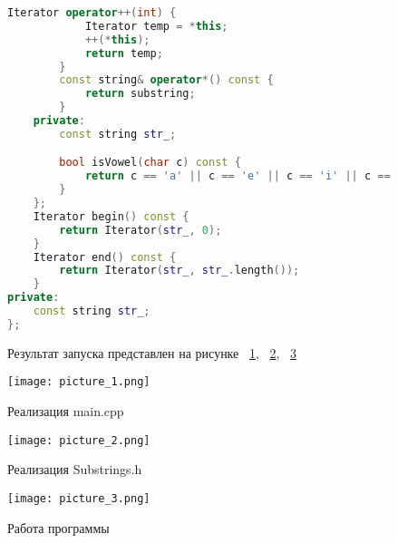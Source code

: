 \documentclass[a4paper, 14pt]{extarticle}
\begin{document}
\begin{figure}[!htb]
\begin{lstlisting}[language={c++},caption={Substrings.h(продолжение)},label={lst:code3}]
        Iterator operator++(int) {
            Iterator temp = *this;
            ++(*this);
            return temp;
        }
        const string& operator*() const {
            return substring;
        }
    private:
        const string str_;

        bool isVowel(char c) const {
            return c == 'a' || c == 'e' || c == 'i' || c == 'o' || c == 'u' || c == 'A' || c == 'E' || c == 'I' || c == 'O' || c == 'U';
        }
    };
    Iterator begin() const {
        return Iterator(str_, 0);
    }
    Iterator end() const {
        return Iterator(str_, str_.length());
    }
private:
    const string str_;
};
\end{lstlisting}
\end{figure}

\begin{figure}[!htb]
Результат запуска представлен на рисунке ~\ref{fig:picture_1.png}, ~\ref{fig:picture_2.png}, ~\ref{fig:picture_3.png}
\end{figure}

\begin{figure}[!htb]
	\centering
	\texttt{[image: picture\_1.png]}
\caption{Реализация main.cpp}
\label{fig:picture_1.png}
\end{figure}

\begin{figure}[!htb]
	\centering
	\texttt{[image: picture\_2.png]}
\caption{Реализация Substrings.h}
\label{fig:picture_2.png}
\end{figure}

\begin{figure}[!htb]
	\centering
	\texttt{[image: picture\_3.png]}
\caption{Работа программы}
\label{fig:picture_3.png}
\end{figure}
\end{document}
